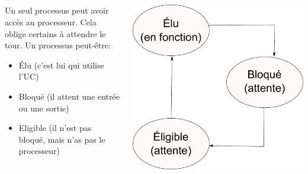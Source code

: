 \subsection{\subsectitle}
\begin{frame}{\sectitle}
\begin{columns}[c]
\begin{block}{\subsectitle}
Un seul processus peut avoir accès au processeur. Cela oblige certains à attendre le tour.
Un processus peut-être:
\begin{itemize}
\item Élu (c'est lui qui utilise l'UC)
\item Bloqué (il attent une entrée ou une sortie)
\item Eligible (il n'est pas bloqué, mais n'as pas le processeur)
\end{itemize}
\end{block}

\includegraphics[width=\textwidth]{images/Status.pdf}
\end{columns}

\end{frame}



\def\subsectitle{L'espace de travail}
